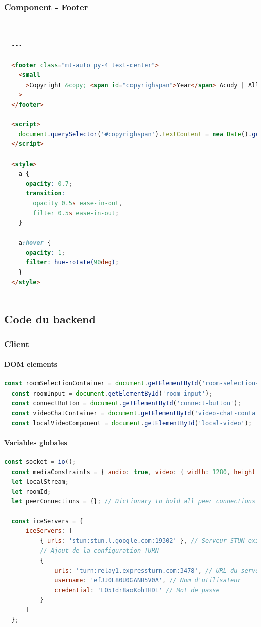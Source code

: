 \documentclass[12pt, a4paper, oneside]{article}
\newcommand{\subsubsubsection}[1]{\paragraph{#1}\mbox{}\par}
\begin{document}
\newpage
\subsubsection{Component - Footer}

\begin{lstlisting}[language=HTML, caption={Component - Footer}, label=Component - Footer]
  ---

  ---
  
  <footer class="mt-auto py-4 text-center">
    <small
      >Copyright &copy; <span id="copyrighspan">Year</span> Acody | All rights reserved</small
    >
  </footer>
  
  <script>
    document.querySelector('#copyrighspan').textContent = new Date().getFullYear().toString()
  </script>
  
  <style>
    a {
      opacity: 0.7;
      transition:
        opacity 0.5s ease-in-out,
        filter 0.5s ease-in-out;
    }
  
    a:hover {
      opacity: 1;
      filter: hue-rotate(90deg);
    }
  </style>
  
\end{lstlisting}

\newpage
\subsection{Code du backend}

\subsubsection{Client}

\subsubsubsection{DOM elements}

\begin{lstlisting}[language=JavaScript, caption={DOM Elements}, label=DOM Elements]
  const roomSelectionContainer = document.getElementById('room-selection-container');
  const roomInput = document.getElementById('room-input');
  const connectButton = document.getElementById('connect-button');
  const videoChatContainer = document.getElementById('video-chat-container');
  const localVideoComponent = document.getElementById('local-video');
\end{lstlisting}

\subsubsubsection{Variables globales}

\begin{lstlisting}[language=JavaScript, caption={Variables}, label=Variables]
  const socket = io();
  const mediaConstraints = { audio: true, video: { width: 1280, height: 720 } };
  let localStream;
  let roomId;
  let peerConnections = {}; // Dictionary to hold all peer connections
  
  const iceServers = {
      iceServers: [
          { urls: 'stun:stun.l.google.com:19302' }, // Serveur STUN existant
          // Ajout de la configuration TURN
          {
              urls: 'turn:relay1.expressturn.com:3478', // URL du serveur TURN
              username: 'efJJ0L80U0GANH5V0A', // Nom d'utilisateur
              credential: 'LO5Tdr8aoKohTHDL' // Mot de passe
          }
      ]
  };
\end{lstlisting}
\end{document}
